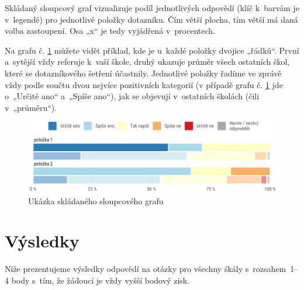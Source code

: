 \documentclass[12pt,a4paper,]{report}
\begin{document}
Skládaný sloupcový graf vizualizuje podíl jednotlivých odpovědí (klíč k~barvám je v~legendě) pro jednotlivé položky dotazníku. Čím větší plocha, tím větší má daná volba zastoupení. Osa „x`` je tedy vyjádřená v~procentech.

Na grafu č. \ref{fig:stackedBarPlot} můžete vidět příklad, kde je u~každé položky dvojice „řádků``. První a~sytější vždy referuje k~vaší škole, druhý ukazuje průměr všech ostatních škol, které se dotazníkového šetření účastnily. Jednotlivé položky řadíme ve zprávě vždy podle součtu dvou nejvíce pozitivních kategorií (v případě grafu č. \ref{fig:stackedBarPlot} jde o~„Určitě ano`` a~„Spíše ano``), jak se objevují v~ostatních školách (čili v~„průměru``).

\begin{figure}

{\centering \includegraphics[width=\textwidth]{figs/stackedBarPlot-1} 

}

\caption{Ukázka skládaného sloupcového grafu}\label{fig:stackedBarPlot}
\end{figure}

\hypertarget{vuxfdsledky}{%
\chapter{Výsledky}\label{vuxfdsledky}}

Níže prezentujeme výsledky odpovědí na otázky pro všechny škály s~rozsahem~1--4 body s~tím, že žádoucí je vždy vyšší bodový zisk.
\end{document}
